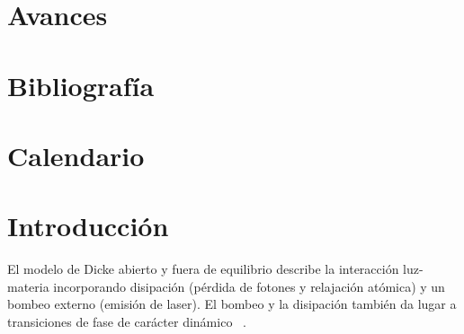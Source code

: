 \documentclass[onecolumn,notitlepage,letterpaper,aps,pra,12pt]{article}
\numberwithin{equation}{section}
\begin{document}
\section{Avances}






\section{Bibliografía}

\printbibliography[heading=none]

\section{Calendario}





\clearpage
\section{Introducción}







El modelo de Dicke abierto y fuera de equilibrio describe la interacción luz-materia incorporando disipación (pérdida de fotones y relajación atómica) y un bombeo externo (emisión de laser). El bombeo y la disipación también da lugar a transiciones de fase de carácter dinámico%
~\cite{kirton2017,LeBoite2020}. 
\end{document}
